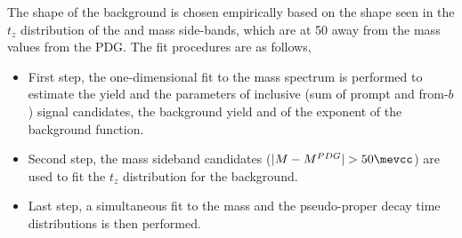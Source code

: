 The shape of the background is chosen empirically based on the shape seen in the $t_z$ distribution of the \jpsi and \psitwos mass side-bands, which are at 50 \mevcc away from the mass values from the PDG.
The fit procedures are as follows,
\begin{itemize}
\item First step, the one-dimensional fit to the mass spectrum is performed to estimate the yield and the parameters of inclusive (sum of prompt and from-$b$) signal candidates, the background yield and of the exponent of the background function.
\item Second step, the mass sideband candidates ($|M-M^{PDG}|>50\mevcc$) are used to fit the $t_z$ distribution for the background. 
\item Last step, a simultaneous fit to the mass and the pseudo-proper decay time distributions is then performed.
\end{itemize}

